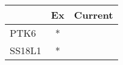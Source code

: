 \begin{tabular}{lcc}
\toprule
{} & Ex & Current \\
\midrule
PTK6   &  * &         \\
SS18L1 &  * &         \\
\bottomrule
\end{tabular}
